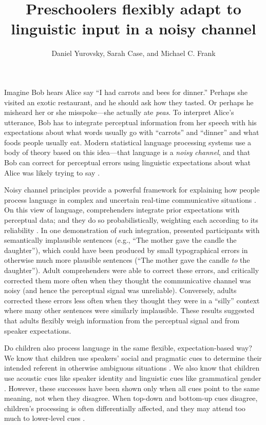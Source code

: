 \documentclass[man,floatsintext]{apa6}
\title{Preschoolers flexibly adapt to linguistic input in a noisy channel}
\author{Daniel Yurovsky, Sarah Case, and Michael C. Frank}
\affiliation{Stanford University}
\begin{document}
\maketitle

Imagine Bob hears Alice say ``I had carrots and bees for dinner.'' Perhaps she visited an exotic restaurant, and he should ask how they tasted. Or perhaps he misheard her or she misspoke---she actually ate \emph{peas}. To interpret Alice's utterance, Bob has to integrate perceptual information from her speech with his expectations about what words usually go with ``carrots'' and ``dinner'' and what foods people usually eat. Modern statistical language processing systems use a body of theory based on this idea---that language is a \emph{noisy channel}, and that Bob can correct for perceptual errors using linguistic expectations about what Alice was likely trying to say \cite{jelinek1976, shannon1948}.

Noisy channel principles provide a powerful framework for explaining how people process language in complex and uncertain real-time communicative situations \cite{clayards2008, levy2008, jaeger2010, kleinschmidt2015}. On this view of language, comprehenders integrate prior expectations with perceptual data; and they do so probabilistically, weighting each according to its reliability \cite{ernst2002, jacobs1999}. In one demonstration of such integration,  presented participants with semantically implausible sentences (e.g., ``The mother gave the candle the daughter''), which could have been produced by small typographical errors in otherwise much more plausible sentences (``The mother gave the candle \emph{to} the daughter''). Adult comprehenders were able to correct these errors, and critically corrected them more often when they thought the communicative channel was noisy (and hence the perceptual signal was unreliable). Conversely, adults corrected these errors less often when they thought they were in a ``silly'' context where many other sentences were similarly implausible. These results suggested that adults flexibly weigh information from the perceptual signal and from speaker expectations.

Do children also process language in the same flexible, expectation-based way? We know that children use speakers' social and pragmatic cues to determine their intended referent in otherwise ambiguous situations \cite{carpenter1998, clark2009}. We also know that children use acoustic cues like speaker identity and linguistic cues like grammatical gender \cite{lew-williams2007, creel2012}. However, these successes have been shown only when all cues point to the same meaning, not when they disagree. When top-down and bottom-up cues disagree, children's processing is often differentially affected, and they may attend too much to lower-level cues \cite{trueswell1999,snedeker2003}.
\end{document}
